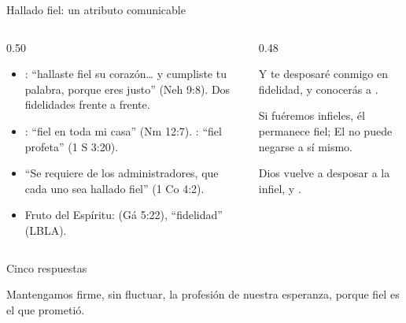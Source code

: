 \begin{frame}{Hallado fiel: un atributo comunicable}
\begin{columns}[t,onlytextwidth]
\begin{column}{0.50\textwidth}\small
\begin{itemize}
\item {}: ``hallaste fiel su corazón\ldots{} y cumpliste tu palabra, porque eres justo'' (Neh 9:8). Dos fidelidades frente a frente.
\item {}: ``fiel en toda mi casa'' (Nm 12:7). : ``fiel profeta'' (1 S 3:20).
\item ``Se requiere de los administradores, que cada uno sea hallado fiel'' (1 Co 4:2).
\item Fruto del Espíritu:  (Gá 5:22), ``fidelidad'' (LBLA).
\end{itemize}
\end{column}
\begin{column}{0.48\textwidth}
\begin{cita}Y te desposaré conmigo en fidelidad, y conocerás a \SENOR.\end{cita}
\begin{cita}Si fuéremos infieles, él permanece fiel; El no puede negarse a sí mismo.\end{cita}
\scriptsize Dios vuelve a desposar a la infiel, y .
\end{column}
\end{columns}
\end{frame}

\begin{frame}{Cinco respuestas}
\par\medskip
\begin{cita}Mantengamos firme, sin fluctuar, la profesión de nuestra esperanza, porque fiel es el que prometió.\end{cita}
\end{frame}

